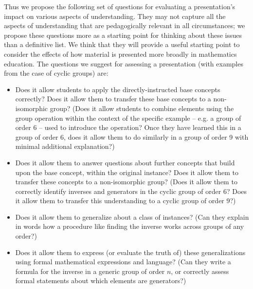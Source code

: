 \documentclass[man,10pt]{apa6}
\begin{document}
Thus we propose the following set of questions for evaluating a presentation's impact on various aspects of understanding. They may not capture all the aspects of understanding that are pedagogically relevant in all circumstances; we propose these questions more as a starting point for thinking about these issues than a definitive list. We think that they will provide a useful starting point to consider the effects of how material is presented more broadly in mathematics education. The questions we suggest for assessing a presentation (with examples from the case of cyclic groups) are:
\begin{itemize}
\item Does it allow students to apply the directly-instructed base concepts correctly? Does it allow them to transfer these base concepts to a non-isomorphic group? (Does it allow students to combine elements using the group operation within the context of the specific example -- e.g. a group of order 6 -- used to introduce the operation? Once they have learned this in a group of order 6, does it allow them to do similarly in a group of order 9 with minimal additional explanation?) 
\item Does it allow them to answer questions about further concepts that build upon the base concept, within the original instance? Does it allow them to transfer these concepts to a non-isomorphic group? (Does it allow them to correctly identify inverses and generators in the cyclic group of order 6? Does it allow them to transfer this understanding to a cyclic group of order 9?)
\item Does it allow them to generalize about a class of instances? (Can they explain in words how a procedure like finding the inverse works across groups of any order?) 
\item Does it allow them to express (or evaluate the truth of) these generalizations using formal mathematical expressions and language? (Can they write a formula for the inverse in a generic group of order $n$, or correctly assess formal statements about which elements are generators?)
\end{itemize}
\end{document}
